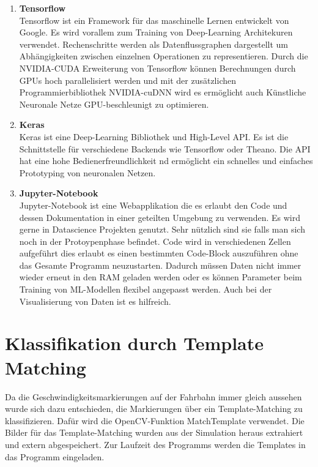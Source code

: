\begin{enumerate}
\item[] \textbf{Tensorflow}\hfill \\
Tensorflow ist ein Framework f{\"u}r das maschinelle Lernen entwickelt von Google.
Es wird vorallem zum Training von Deep-Learning Architekuren verwendet.
Rechenschritte werden als Datenflussgraphen dargestellt um Abh{\"a}ngigkeiten zwischen einzelnen Operationen zu representieren.
Durch die NVIDIA-CUDA Erweiterung von Tensorflow k{\"o}nnen Berechnungen durch GPUs hoch parallelisiert werden und mit der zus{\"a}tzlichen Programmierbibliothek NVIDIA-cuDNN wird es
erm{\"o}glicht auch K{\"u}nstliche Neuronale Netze GPU-beschleunigt zu optimieren.
\item[] \textbf{Keras}\hfill \\
Keras ist eine Deep-Learning Bibliothek und High-Level API. Es ist die Schnittstelle f{\"u}r verschiedene Backends wie Tensorflow oder Theano. Die API hat eine hohe Bedienerfreundlichkeit nd erm{\"o}glicht ein schnelles und einfaches Prototyping von neuronalen Netzen.
\item[] \textbf{Jupyter-Notebook}\hfill \\
Jupyter-Notebook ist eine Webapplikation die es erlaubt den Code und dessen Dokumentation in einer geteilten Umgebung zu verwenden. Es wird gerne in Datascience Projekten genutzt. Sehr n{\"u}tzlich sind sie falls man sich noch in der Protoypenphase befindet. Code wird in verschiedenen Zellen aufgef{\"u}hrt dies erlaubt es einen bestimmten Code-Block auszuf{\"u}hren ohne das Gesamte Programm neuzustarten.  Dadurch m{\"u}ssen Daten nicht immer wieder erneut in den RAM geladen werden oder es k{\"o}nnen Parameter beim Training von ML-Modellen flexibel angepasst werden. Auch bei der Visualisierung von Daten ist es hilfreich.



\end{enumerate}


\section{Klassifikation durch Template Matching}
\label{sec:Klassifikation durch Template Matching}

Da die Geschwindigkeitsmarkierungen auf der Fahrbahn immer gleich aussehen wurde sich dazu entschieden, die Markierungen {\"u}ber ein Template-Matching zu klassifizieren.
Daf{\"u}r wird die OpenCV-Funktion MatchTemplate verwendet.
Die Bilder f{\"u}r das Template-Matching wurden aus der Simulation heraus extrahiert und extern abgespeichert. Zur Laufzeit des Programms werden die Templates in das Programm eingeladen.


